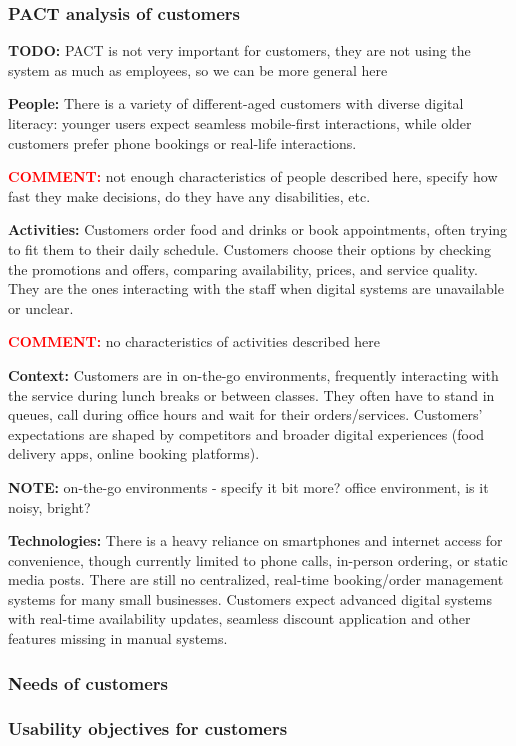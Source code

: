 \documentclass[]{VUMIFTemplateClass}
\newcommand{\yellowcomment}[1]{%
    \begin{tcolorbox}[colback=yellow!80, colframe=yellow!80, arc=0pt, outer arc=0pt, boxrule=0pt, left=3pt, right=3pt, top=3pt, bottom=3pt]
        \textbf{\textcolor{red}{COMMENT:}} #1
    \end{tcolorbox}
}
\newcommand{\noticecomment}[1]{%
    \begin{tcolorbox}[colback=blue!20, colframe=blue!60, arc=0pt, outer arc=0pt, boxrule=1pt, left=3pt, right=3pt, top=3pt, bottom=3pt]
        \textbf{\textcolor{blue!70!black}{NOTE:}} #1
    \end{tcolorbox}
}
\newcommand{\todocomment}[1]{%
    \begin{tcolorbox}[colback=red!20, colframe=red!60, arc=0pt, outer arc=0pt, boxrule=1pt, left=3pt, right=3pt, top=3pt, bottom=3pt]
        \textbf{\textcolor{orange!70!black}{TODO:}} #1
    \end{tcolorbox}
}
\begin{document}
\subsubsection{PACT analysis of customers}
\todocomment{PACT is not very important for customers, they are not using the system as much as employees, so we can be more general here}
\textbf{People:} There is a variety of different-aged customers with diverse
digital literacy: younger users expect seamless mobile-first interactions, while
older customers prefer phone bookings or real-life interactions. 
\yellowcomment{not enough characteristics of people described here, specify how fast they make decisions, do they have any disabilities, etc. }

\textbf{Activities:} Customers order food and drinks or book appointments, often
trying to fit them to their daily schedule. Customers choose their options by
checking the promotions and offers, comparing availability, prices, and service
quality. They are the ones interacting with the staff when digital systems are
unavailable or unclear.

\yellowcomment{no characteristics of activities described here}

\textbf{Context:} Customers are in on-the-go environments, frequently
interacting with the service during lunch breaks or between classes. They often
have to stand in queues, call during office hours and wait for their
orders/services. Customers' expectations are shaped by competitors and broader
digital experiences (food delivery apps, online booking platforms).

\noticecomment{on-the-go environments - specify it bit more? office environment, is it noisy, bright?}

\textbf{Technologies:} There is a heavy reliance on smartphones and internet
access for convenience, though currently limited to phone calls, in-person
ordering, or static media posts. There are still no centralized, real-time
booking/order management systems for many small businesses. Customers expect
advanced digital systems with real-time availability updates, seamless discount
application and other features missing in manual systems.

\subsubsection{Needs of customers}

\subsubsection{Usability objectives for customers}
\end{document}
